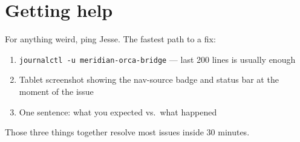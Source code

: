 \documentclass[10pt,a4paper]{article}
\begin{document}
\section{Getting help}
For anything weird, ping Jesse. The fastest path to a fix:
\begin{enumerate}
\item \texttt{journalctl -u meridian-orca-bridge} --- last 200 lines is usually enough
\item Tablet screenshot showing the nav-source badge and status bar at the moment of the issue
\item One sentence: what you expected vs.\ what happened
\end{enumerate}

Those three things together resolve most issues inside 30 minutes.
\end{document}
